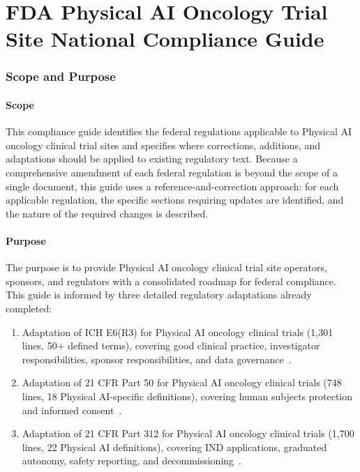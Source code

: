 

\part{FDA Physical AI Oncology Trial Site National Compliance Guide}
\setcounter{section}{0}

\section{Scope and Purpose}

\subsection{Scope}

This compliance guide identifies the federal regulations applicable to
Physical AI oncology clinical trial sites and specifies where corrections,
additions, and adaptations should be applied to existing regulatory text.
Because a comprehensive amendment of each federal regulation is beyond the
scope of a single document, this guide uses a reference-and-correction approach:
for each applicable regulation, the specific sections requiring updates are
identified, and the nature of the required changes is described.

\subsection{Purpose}

The purpose is to provide Physical AI oncology clinical trial site operators,
sponsors, and regulators with a consolidated roadmap for federal compliance.
This guide is informed by three detailed regulatory adaptations already
completed:

\begin{enumerate}[label=(\arabic*)]
\item Adaptation of ICH E6(R3) for Physical AI oncology clinical trials
  (1,301 lines, 50+ defined terms), covering good clinical practice,
  investigator responsibilities, sponsor responsibilities, and data
  governance~\cite{iche6r3adapt}.
\item Adaptation of 21 CFR Part 50 for Physical AI oncology clinical trials
  (748 lines, 18 Physical AI-specific definitions), covering human subjects
  protection and informed consent~\cite{cfr50adapt}.
\item Adaptation of 21 CFR Part 312 for Physical AI oncology clinical trials
  (1,700 lines, 22 Physical AI definitions), covering IND applications,
  graduated autonomy, safety reporting, and
  decommissioning~\cite{cfr312adapt}.
\end{enumerate}

